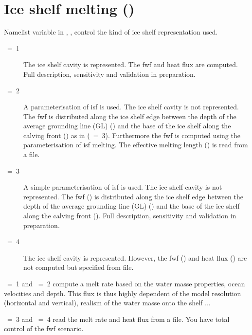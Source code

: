\section   [Ice shelf melting (\textit{sbcisf})]
                        {Ice shelf melting ()}
\label{SBC_isf}
Namelist variable in , ,  control the kind of ice shelf representation used. 
\begin{description}
\item[~=~1]
The ice shelf cavity is represented. The fwf and heat flux are computed. 
Full description, sensitivity and validation in preparation. 

\item[~=~2]
A parameterisation of isf is used. The ice shelf cavity is not represented. 
The fwf is distributed along the ice shelf edge between the depth of the average grounding line (GL)
() and the base of the ice shelf along the calving front () as in (~=~3). 
Furthermore the fwf is computed using the \citet{Beckmann2003} parameterisation of isf melting. 
The effective melting length () is read from a file.

\item[~=~3]
A simple parameterisation of isf is used. The ice shelf cavity is not represented. 
The fwf () is distributed along the ice shelf edge between the depth of the average grounding line (GL)
() and the base of the ice shelf along the calving front ().
Full description, sensitivity and validation in preparation.

\item[~=~4]
The ice shelf cavity is represented. However, the fwf () and heat flux () are 
not computed but specified from file. 
\end{description}

~=~1 and ~=~2 compute a melt rate based on the water masse properties, ocean velocities and depth.
 This flux is thus highly dependent of the model resolution (horizontal and vertical), realism of the water masse onto the shelf ...

~=~3 and ~=~4 read the melt rate and heat flux from a file. You have total control of the fwf scenario.

